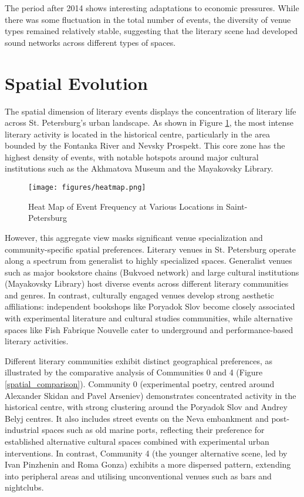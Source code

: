 \documentclass{jcls}
\begin{document}
The period after 2014 shows interesting adaptations to economic pressures. While there was some fluctuation in the total number of events, the diversity of venue types remained relatively stable, suggesting that the literary scene had developed sound networks across different types of spaces. 


\section{Spatial Evolution}

The spatial dimension of literary events displays the concentration of literary life across St. Petersburg's urban landscape. As shown in Figure \ref{heatmap}, the most intense literary activity is located in the historical centre, particularly in the area bounded by the Fontanka River and Nevsky Prospekt. This core zone has the highest density of events, with notable hotspots around major cultural institutions such as the Akhmatova Museum and the Mayakovsky Library.

\begin{figure}
	\texttt{[image: figures/heatmap.png]}
	\caption{Heat Map of Event Frequency at Various Locations in Saint-Petersburg}
    \label{heatmap}
\end{figure}

However, this aggregate view masks significant venue specialization and community-specific spatial preferences. Literary venues in St. Petersburg operate along a spectrum from generalist to highly specialized spaces. Generalist venues such as major bookstore chains (Bukvoed network) and large cultural institutions (Mayakovsky Library) host diverse events across different literary communities and genres. In contrast, culturally engaged venues develop strong aesthetic affiliations: independent bookshops like Poryadok Slov become closely associated with experimental literature and cultural studies communities, while alternative spaces like Fish Fabrique Nouvelle cater to underground and performance-based literary activities. 

Different literary communities exhibit distinct geographical preferences, as illustrated by the comparative analysis of Communities 0 and 4 (Figure \ref{spatial_comparison}). Community 0 (experimental poetry, centred around Alexander Skidan and Pavel Arseniev) demonstrates concentrated activity in the historical centre, with strong clustering around the Poryadok Slov and Andrey Belyj centres. It also includes street events on the Neva embankment and post-industrial spaces such as old marine ports, reflecting their preference for established alternative cultural spaces combined with experimental urban interventions. In contrast, Community 4 (the younger alternative scene, led by Ivan Pinzhenin and Roma Gonza) exhibits a more dispersed pattern, extending into peripheral areas and utilising unconventional venues such as bars and nightclubs.
\end{document}
